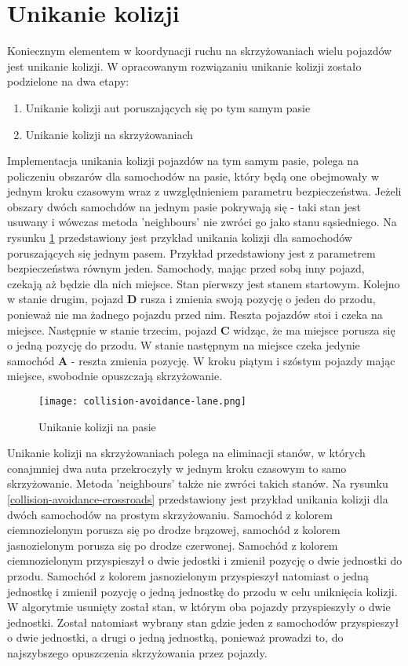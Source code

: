 \section{Unikanie kolizji}

Koniecznym elementem w koordynacji ruchu na skrzyżowaniach wielu pojazdów jest unikanie kolizji. W opracowanym rozwiązaniu unikanie kolizji zostało podzielone na dwa etapy:
\begin{enumerate}
\item Unikanie kolizji aut poruszających się po tym samym pasie
\item Unikanie kolizji na skrzyżowaniach
\end{enumerate}
Implementacja unikania kolizji pojazdów na tym samym pasie, polega na policzeniu obszarów dla samochodów na pasie, który będą one obejmowały w jednym kroku czasowym wraz z uwzględnieniem parametru bezpieczeństwa. Jeżeli obszary dwóch samochdów na jednym pasie pokrywają się - taki stan jest usuwany i wówczas metoda 'neighbours' nie zwróci go jako stanu sąsiedniego. Na rysunku \ref{collision-avoidance-lane} przedstawiony jest przykład unikania kolizji dla samochodów poruszających się jednym pasem. Przykład przedstawiony jest z parametrem bezpieczeństwa równym jeden. Samochody, mając przed sobą inny pojazd, czekają aż będzie dla nich miejsce. Stan pierwszy jest stanem startowym. Kolejno w stanie drugim, pojazd \textbf{D} rusza i zmienia swoją pozycję o jeden do przodu, ponieważ nie ma żadnego pojazdu przed nim. Reszta pojazdów stoi i czeka na miejsce. Następnie w stanie trzecim, pojazd \textbf{C} widząc, że ma miejsce porusza się o jedną pozycję do przodu. W stanie następnym na miejsce czeka jedynie samochód \textbf{A} - reszta zmienia pozycję. W kroku piątym i szóstym pojazdy mając miejsce, swobodnie opuszczają skrzyżowanie.
\begin{figure}[H]
    \texttt{[image: collision-avoidance-lane.png]}
  \caption{Unikanie kolizji na pasie}
  \label{collision-avoidance-lane}
\end{figure}
\newpage
Unikanie kolizji na skrzyżowaniach polega na eliminacji stanów, w których conajmniej dwa auta przekroczyły w jednym kroku czasowym to samo skrzyżowanie. Metoda 'neighbours' także nie zwróci takich stanów. Na rysunku \ref{collision-avoidance-crossroads} przedstawiony jest przykład unikania kolizji dla dwóch samochodów na prostym skrzyżowaniu. Samochód z kolorem ciemnozielonym porusza się po drodze brązowej, samochód z kolorem jasnozielonym porusza się po drodze czerwonej. Samochód z kolorem ciemnozielonym przyspieszył o dwie jedostki i zmienił pozycję o dwie jednostki do przodu. Samochód z kolorem jasnozielonym przyspieszył natomiast o jedną jednostkę i zmienił pozycję o jedną jednostkę do przodu w celu uniknięcia kolizji. W algorytmie usunięty został stan, w którym oba pojazdy przyspieszyły o dwie jednostki. Został natomiast wybrany stan gdzie jeden z samochodów przyspieszył o dwie jednostki, a drugi o jedną jednostką, ponieważ prowadzi to, do najszybszego opuszczenia skrzyżowania przez pojazdy.
